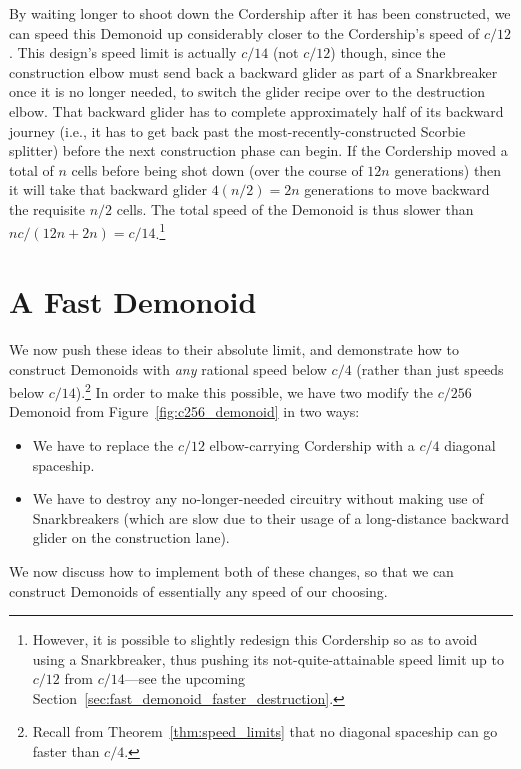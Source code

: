 By waiting longer to shoot down the Cordership after it has been constructed, we can speed this Demonoid up considerably closer to the Cordership's speed of $c/12$. This design's speed limit is actually $c/14$ (not $c/12$) though, since the construction elbow must send back a backward glider as part of a Snarkbreaker once it is no longer needed, to switch the glider recipe over to the destruction elbow. That backward glider has to complete approximately half of its backward journey (i.e., it has to get back past the most-recently-constructed Scorbie splitter) before the next construction phase can begin. If the Cordership moved a total of $n$ cells before being shot down (over the course of $12n$ generations) then it will take that backward glider $4(n/2) = 2n$ generations to move backward the requisite $n/2$ cells. The total speed of the Demonoid is thus slower than $nc/(12n + 2n) = c/14$.\footnote{However, it is possible to slightly redesign this Cordership so as to avoid using a Snarkbreaker, thus pushing its not-quite-attainable speed limit up to $c/12$ from $c/14$---see the upcoming Section~\ref{sec:fast_demonoid_faster_destruction}.}


\section{A Fast Demonoid}\label{sec:fast_demonoid}

We now push these ideas to their absolute limit, and demonstrate how to construct Demonoids with \emph{any} rational speed below $c/4$ (rather than just speeds below $c/14$).\footnote{Recall from Theorem~\ref{thm:speed_limits} that no diagonal spaceship can go faster than $c/4$.} In order to make this possible, we have two modify the $c/256$ Demonoid from Figure~\ref{fig:c256_demonoid} in two ways:\smallskip

\begin{itemize}
	\item We have to replace the $c/12$ elbow-carrying Cordership with a $c/4$ diagonal spaceship.\smallskip
	
	\item We have to destroy any no-longer-needed circuitry without making use of Snarkbreakers (which are slow due to their usage of a long-distance backward glider on the construction lane).\smallskip
\end{itemize}

We now discuss how to implement both of these changes, so that we can construct Demonoids of essentially any speed of our choosing.


